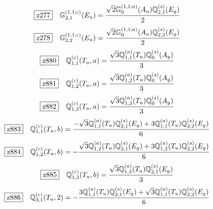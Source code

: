 \documentclass[fleqn,10pt,landscape]{jsarticle}
\begin{document}
\begin{dmath*}
\hspace*{3mm}\fbox{z277}\quad \mathbb{G}_{2,1}^{(1,1;c)}(E_{u})=\frac{\sqrt{2} \mathbb{G}_{0}^{(1,1;a)}(A_{u}) \mathbb{Q}_{2,1}^{(s)}(E_{g})}{2}
\end{dmath*}
\begin{dmath*}
\hspace*{3mm}\fbox{z278}\quad \mathbb{G}_{2,2}^{(1,1;c)}(E_{u})=\frac{\sqrt{2} \mathbb{G}_{0}^{(1,1;a)}(A_{u}) \mathbb{Q}_{2,2}^{(s)}(E_{g})}{2}
\end{dmath*}
\begin{dmath*}
\hspace*{3mm}\fbox{z880}\quad \mathbb{Q}_{1,1}^{(c)}(T_{u},a)=\frac{\sqrt{3} \mathbb{Q}_{1,1}^{(a)}(T_{u}) \mathbb{Q}_{0}^{(s)}(A_{g})}{3}
\end{dmath*}
\begin{dmath*}
\hspace*{3mm}\fbox{z881}\quad \mathbb{Q}_{1,2}^{(c)}(T_{u},a)=\frac{\sqrt{3} \mathbb{Q}_{1,2}^{(a)}(T_{u}) \mathbb{Q}_{0}^{(s)}(A_{g})}{3}
\end{dmath*}
\begin{dmath*}
\hspace*{3mm}\fbox{z882}\quad \mathbb{Q}_{1,3}^{(c)}(T_{u},a)=\frac{\sqrt{3} \mathbb{Q}_{1,3}^{(a)}(T_{u}) \mathbb{Q}_{0}^{(s)}(A_{g})}{3}
\end{dmath*}
\begin{dmath*}
\hspace*{3mm}\fbox{z883}\quad \mathbb{Q}_{1,1}^{(c)}(T_{u},b)=\frac{- \sqrt{3} \mathbb{Q}_{1,1}^{(a)}(T_{u}) \mathbb{Q}_{2,1}^{(s)}(E_{g}) + 3 \mathbb{Q}_{1,1}^{(a)}(T_{u}) \mathbb{Q}_{2,2}^{(s)}(E_{g})}{6}
\end{dmath*}
\begin{dmath*}
\hspace*{3mm}\fbox{z884}\quad \mathbb{Q}_{1,2}^{(c)}(T_{u},b)=- \frac{\sqrt{3} \mathbb{Q}_{1,2}^{(a)}(T_{u}) \mathbb{Q}_{2,1}^{(s)}(E_{g}) + 3 \mathbb{Q}_{1,2}^{(a)}(T_{u}) \mathbb{Q}_{2,2}^{(s)}(E_{g})}{6}
\end{dmath*}
\begin{dmath*}
\hspace*{3mm}\fbox{z885}\quad \mathbb{Q}_{1,3}^{(c)}(T_{u},b)=\frac{\sqrt{3} \mathbb{Q}_{1,3}^{(a)}(T_{u}) \mathbb{Q}_{2,1}^{(s)}(E_{g})}{3}
\end{dmath*}
\begin{dmath*}
\hspace*{3mm}\fbox{z886}\quad \mathbb{Q}_{3,1}^{(c)}(T_{u},2)=- \frac{3 \mathbb{Q}_{1,1}^{(a)}(T_{u}) \mathbb{Q}_{2,1}^{(s)}(E_{g}) + \sqrt{3} \mathbb{Q}_{1,1}^{(a)}(T_{u}) \mathbb{Q}_{2,2}^{(s)}(E_{g})}{6}
\end{dmath*}
\end{document}
